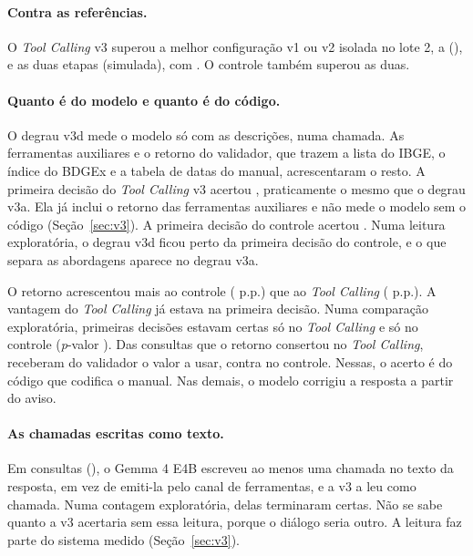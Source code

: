 \paragraph{Contra as referências.} O \textit{Tool Calling} v3 superou a melhor configuração v1 ou v2 isolada no lote 2, a  (), e as duas etapas (simulada), com . O controle também superou as duas.

\paragraph{Quanto é do modelo e quanto é do código.} O degrau v3d mede o modelo só com as descrições, numa chamada. As ferramentas auxiliares e o retorno do validador, que trazem a lista do IBGE, o índice do BDGEx e a tabela de datas do manual, acrescentaram o resto. A primeira decisão do \textit{Tool Calling} v3 acertou , praticamente o mesmo que o degrau v3a. Ela já inclui o retorno das ferramentas auxiliares e não mede o modelo sem o código (Seção~\ref{sec:v3}). A primeira decisão do controle acertou . Numa leitura exploratória, o degrau v3d ficou perto da primeira decisão do controle, e o que separa as abordagens aparece no degrau v3a.

O retorno acrescentou mais ao controle ( p.p.) que ao \textit{Tool Calling} ( p.p.). A vantagem do \textit{Tool Calling} já estava na primeira decisão. Numa comparação exploratória,  primeiras decisões estavam certas só no \textit{Tool Calling} e  só no controle (\textit{p}-valor ). Das consultas que o retorno consertou no \textit{Tool Calling},  receberam do validador o valor a usar, contra  no controle. Nessas, o acerto é do código que codifica o manual. Nas demais, o modelo corrigiu a resposta a partir do aviso.


\paragraph{As chamadas escritas como texto.} Em  consultas (), o Gemma 4 E4B escreveu ao menos uma chamada no texto da resposta, em vez de emiti-la pelo canal de ferramentas, e a v3 a leu como chamada. Numa contagem exploratória,  delas terminaram certas. Não se sabe quanto a v3 acertaria sem essa leitura, porque o diálogo seria outro. A leitura faz parte do sistema medido (Seção~\ref{sec:v3}).

